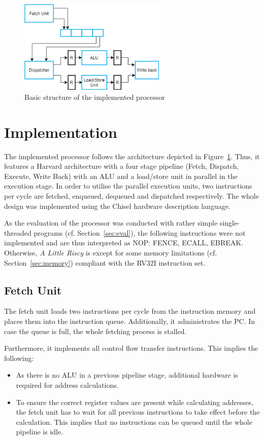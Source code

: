 \documentclass[conference]{IEEEtran}
\begin{document}
\begin{figure}[h]
	\centering
	\includegraphics[width=7cm]{basic_architecture_2.PNG}
	\caption{Basic structure of the implemented processor \cite{Hamacher}}
	\label{fig:basic_arch}
\end{figure}

\section{Implementation} \label{sec:implementation}
The implemented processor follows the architecture depicted in Figure~\ref{fig:basic_arch}. Thus, it features a Harvard architecture with a four stage pipeline (Fetch, Dispatch, Execute, Write Back) with an ALU and a load/store unit in parallel in the execution stage. In order to utilise the parallel execution units, two instructions per cycle are fetched, enqueued, dequeued and dispatched respectively. The whole design was implemented using the Chisel hardware description language.

As the evaluation of the processor was conducted with rather simple single-threaded programs (cf. Section~\ref{sec:eval}), the following instructions were not implemented and are thus interpreted as NOP: FENCE, ECALL, EBREAK. Otherwise, \emph{A Little Riscy} is except for some memory limitations (cf. Section~\ref{sec:memory}) compliant with the RV32I instruction set.

\subsection{Fetch Unit} \label{sec:fetch}
The fetch unit loads two instructions per cycle from the instruction memory and places them into the instruction queue. Additionally, it administrates the PC. In case the queue is full, the whole fetching process is stalled.

Furthermore, it implements all control flow transfer instructions. This implies the following:
\begin{itemize}
	\item As there is no ALU in a previous pipeline stage, additional hardware is required for address calculations.
	\item To ensure the correct register values are present while calculating addresses, the fetch unit has to wait for all previous instructions to take effect before the calculation. This implies that no instructions can be queued until the whole pipeline is idle.
\end{itemize}
\end{document}
